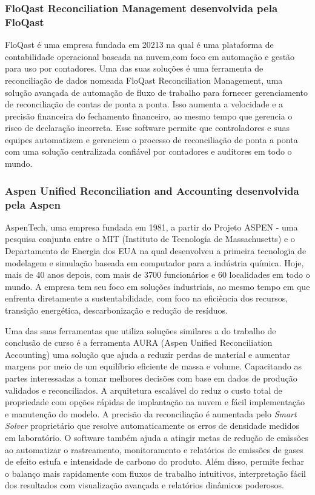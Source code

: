 \subsubsection{FloQast Reconciliation Management desenvolvida pela FloQast}

FloQast é uma empresa fundada em 20213 na qual é uma plataforma  de contabilidade operacional baseada na nuvem,com foco em automação e gestão para uso por contadores. Uma das suas soluções é uma ferramenta de reconciliação de dados nomeada FloQast Reconciliation Management, uma solução avançada de automação de fluxo de trabalho para fornecer gerenciamento de reconciliação de contas de ponta a ponta. Isso aumenta a velocidade e a precisão financeira do fechamento financeiro, ao mesmo tempo que gerencia o risco de declaração incorreta. Esse software permite que controladores e suas equipes automatizem e gerenciem o processo de reconciliação de ponta a ponta com uma solução centralizada confiável por contadores e auditores em todo o mundo.

\subsubsection{Aspen Unified Reconciliation and Accounting desenvolvida pela Aspen}

AspenTech, uma empresa fundada em 1981, a partir do Projeto ASPEN - uma pesquisa conjunta entre o MIT (Instituto de Tecnologia de Massachusetts) e o Departamento de Energia dos EUA na qual desenvolveu a primeira tecnologia de modelagem e simulação baseada em computador para a indústria química. Hoje, mais de 40 anos depois, com mais de 3700 funcionários e 60 localidades em todo o mundo. A empresa tem seu foco em soluções industriais, ao mesmo tempo em que enfrenta diretamente a sustentabilidade, com foco na eficiência dos recursos, transição energética, descarbonização e redução de resíduos.

Uma das suas ferramentas que utiliza soluções similares a do trabalho de conclusão de curso é a ferramenta AURA (Aspen Unified Reconciliation Accounting) uma solução que ajuda a reduzir perdas de material e aumentar margens por meio de um equilíbrio eficiente de massa e volume. Capacitando as partes interessadas a tomar melhores decisões com base em dados de produção validados e reconciliados. A arquitetura escalável do reduz o custo total de propriedade com opções rápidas de implantação na nuvem e fácil implementação e manutenção do modelo. A precisão da reconciliação é aumentada pelo \textit{Smart Solver} proprietário que resolve automaticamente os erros de densidade medidos em laboratório. O software também ajuda a atingir metas de redução de emissões ao automatizar o rastreamento, monitoramento e relatórios de emissões de gases de efeito estufa e intensidade de carbono do produto. Além disso, permite fechar o balanço mais rapidamente com fluxos de trabalho intuitivos, interpretação fácil dos resultados com visualização avançada e relatórios dinâmicos poderosos.

